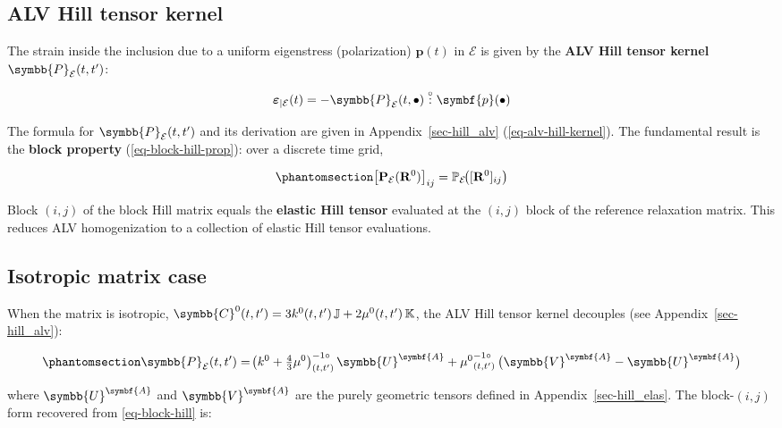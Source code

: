 \documentclass[
  a4paper,
  numbers=noendperiod,
  DIV=12]{scrreprt}
\newcommand{\uu}[1]{{\symbf{{#1}}}}
\newcommand{\uuuu}[1]{{\symbb{{#1}}}}
\newcommand{\volt}[1]{{#1}^{-1\circ}}
\newcommand{\dcirc}{\overset{\circ}{:}}
\begin{document}
\subsection{ALV Hill tensor kernel}\label{alv-hill-tensor-kernel}

The strain inside the inclusion due to a uniform eigenstress
(polarization) \(\uu{p}(t)\) in \(\mathcal{E}\) is given by the
\textbf{ALV Hill tensor kernel} \(\uuuu{P}_\mathcal{E}(t,t')\):

\[
\boldsymbol{\varepsilon}_{|\mathcal{E}}(t) = -\uuuu{P}_\mathcal{E}(t,\bullet) \dcirc \uu{p}(\bullet)
\]

The formula for \(\uuuu{P}_\mathcal{E}(t,t')\) and its derivation are
given in Appendix~\ref{sec-hill_alv} (\ref{eq-alv-hill-kernel}). The
fundamental result is the \textbf{block property}
(\ref{eq-block-hill-prop}): over a discrete time grid,

\begin{equation}\protect\phantomsection\label{eq-block-hill}{
\bigl[\mathbf{P}_\mathcal{E}(\mathbf{R}^0)\bigr]_{ij}
= \mathbb{P}_\mathcal{E}\!\bigl([\mathbf{R}^0]_{ij}\bigr)
}\end{equation}

Block \((i,j)\) of the block Hill matrix equals the \textbf{elastic Hill
tensor} evaluated at the \((i,j)\) block of the reference relaxation
matrix. This reduces ALV homogenization to a collection of elastic Hill
tensor evaluations.

\subsection{Isotropic matrix case}\label{isotropic-matrix-case}

When the matrix is isotropic,
\(\uuuu{C}^0(t,t') = 3k^0(t,t')\,\mathbb{J} + 2\mu^0(t,t')\,\mathbb{K}\),
the ALV Hill tensor kernel decouples (see Appendix~\ref{sec-hill_alv}):

\begin{equation}\protect\phantomsection\label{eq-hill-alv-iso}{
\uuuu{P}_\mathcal{E}(t,t') =
\volt{\!\left(k^0 + \tfrac{4}{3}\mu^0\right)}_{(t,t')}\,\uuuu{U}^{\uu{A}}
+ \volt{\mu^0}_{(t,t')}\,\bigl(\uuuu{V}^{\uu{A}} - \uuuu{U}^{\uu{A}}\bigr)
}\end{equation}

where \(\uuuu{U}^{\uu{A}}\) and \(\uuuu{V}^{\uu{A}}\) are the purely
geometric tensors defined in Appendix~\ref{sec-hill_elas}. The
block-\((i,j)\) form recovered from \ref{eq-block-hill} is:
\end{document}
